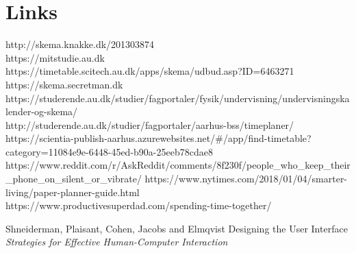 \documentclass{article}
\begin{document}
\section{Links}\label{links}
http://skema.knakke.dk/201303874\\
https://mitstudie.au.dk\\
https://timetable.scitech.au.dk/apps/skema/udbud.asp?ID=6463271\\
https://skema.secretman.dk\\
https://studerende.au.dk/studier/fagportaler/fysik/undervisning/undervisningskalender-og-skema/\\
http://studerende.au.dk/studier/fagportaler/aarhus-bss/timeplaner/\\
https://scientia-publish-aarhus.azurewebsites.net/\#/app/find-timetable?category=11084e9e-6448-45ed-b90a-25eeb78cdae8\\
https://www.reddit.com/r/AskReddit/comments/8f230f/people\_who\_keep\_their\_phone\_on\_silent\_or\_vibrate/ 
https://www.nytimes.com/2018/01/04/smarter-living/paper-planner-guide.html\\
https://www.productivesuperdad.com/spending-time-together/



  


\begin{thebibliography}{1}

Shneiderman, Plaisant, Cohen, Jacobs and Elmqvist
\newblock Designing the User Interface
\newblock \textit{Strategies for Effective Human-Computer Interaction}


\end{thebibliography}
\end{document}

